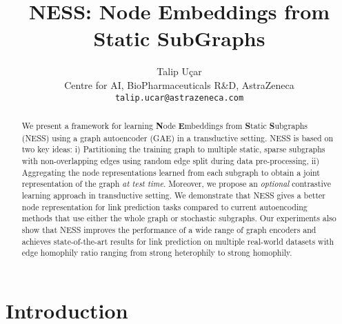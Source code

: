 \documentclass{article}
\title{NESS: Node Embeddings from Static SubGraphs}
\author{Talip Uçar\\
Centre for AI, BioPharmaceuticals R\&D, AstraZeneca\\
\texttt{talip.ucar@astrazeneca.com}
}
\begin{document}
\maketitle

\begin{abstract}
We present a framework for learning \textbf{N}ode \textbf{E}mbeddings from \textbf{S}tatic \textbf{S}ubgraphs (NESS) using a graph autoencoder (GAE) in a transductive setting. NESS is based on two key ideas: i) Partitioning the training graph to multiple static, sparse subgraphs with non-overlapping edges using random edge split during data pre-processing, ii) Aggregating the node representations learned from each subgraph to obtain a joint representation of the graph \textit{at test time}. Moreover, we propose an \textit{optional} contrastive learning approach in transductive setting. We demonstrate that NESS gives a better node representation for link prediction tasks compared to current autoencoding methods that use either the whole graph or stochastic subgraphs. Our experiments also show that NESS improves the performance of a wide range of graph encoders and achieves state-of-the-art results for link prediction on multiple real-world datasets with edge homophily ratio ranging from strong heterophily to strong homophily.
\end{abstract}

\section{Introduction}
\end{document}
